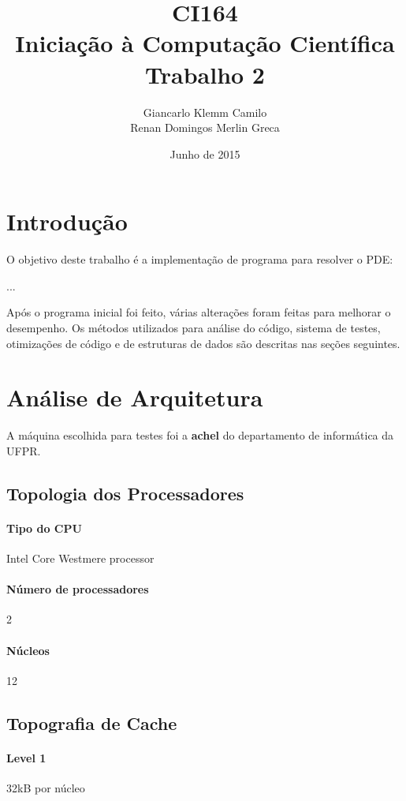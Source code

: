 \documentclass[12pt]{article}
\title{CI164\\Iniciação à Computação Científica\\Trabalho 2}
\author{
	Giancarlo Klemm Camilo \\
	Renan Domingos Merlin Greca
}
\date{Junho de 2015}
\begin{document}
\maketitle
\newpage	

\tableofcontents
\newpage

\section{Introdução}
O objetivo deste trabalho é a implementação de programa para resolver o PDE:

...

Após o programa inicial foi feito, várias alterações foram feitas para melhorar o desempenho. Os métodos utilizados para análise do código, sistema de testes, otimizações de código e de estruturas de dados são descritas nas seções seguintes.

\newpage

\section{Análise de Arquitetura}
A máquina escolhida para testes foi a \textbf{achel} do departamento de informática da UFPR.

\subsection{Topologia dos Processadores}
\paragraph{Tipo do CPU} Intel Core Westmere processor
\paragraph{Número de processadores} 2
\paragraph{Núcleos} 12

\subsection{Topografia de Cache}
\paragraph{Level 1} 32kB por núcleo
\end{document}
